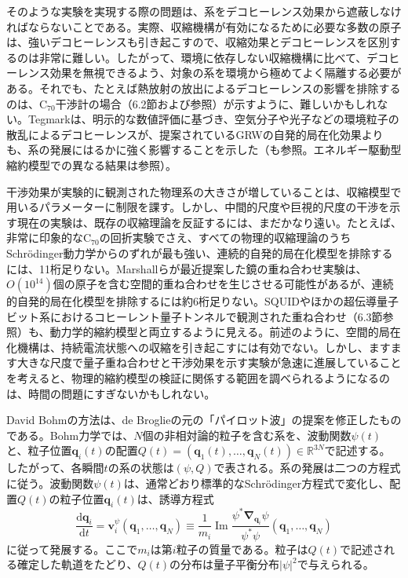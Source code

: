 \hypertarget{srcpage:354}{}\label{srcpage:354}
そのような実験を実現する際の問題は、系をデコヒーレンス効果から遮蔽しなければならないことである。実際、収縮機構が有効になるために必要な多数の原子は、強いデコヒーレンスも引き起こすので、収縮効果とデコヒーレンスを区別するのは非常に難しい\cite{ref166,ref444,ref467}。したがって、環境に依存しない収縮機構に比べて、デコヒーレンス効果を無視できるよう、対象の系を環境から極めてよく隔離する必要がある。それでも、たとえば熱放射の放出によるデコヒーレンスの影響を排除するのは、$\mathrm C_{70}$干渉計の場合（6.2節および\cite{ref267,ref270}参照）が示すように、難しいかもしれない。Tegmark\cite{ref166}は、明示的な数値評価に基づき、空気分子や光子などの環境粒子の散乱によるデコヒーレンスが、提案されているGRWの自発的局在化効果よりも、系の発展にはるかに強く影響することを示した（\cite{ref444,ref467}も参照。エネルギー駆動型縮約模型での異なる結果は\cite{ref461}参照）。

干渉効果が実験的に観測された物理系の大きさが増していることは、収縮模型で用いるパラメーターに制限を課す。しかし、中間的尺度や巨視的尺度の干渉を示す現在の実験は、既存の収縮理論を反証するには、まだかなり遠い。たとえば、非常に印象的な$\mathrm C_{70}$の回折実験でさえ、すべての物理的収縮理論のうちSchrödinger動力学からのずれが最も強い、連続的自発的局在化模型を排除するには、11桁足りない\cite{ref478}。Marshallら\cite{ref477}が最近提案した鏡の重ね合わせ実験は、$O(10^{14})$個の原子を含む空間的重ね合わせを生じさせる可能性があるが、連続的自発的局在化模型を排除するには約6桁足りない\cite{ref477,ref479}。SQUIDやほかの超伝導量子ビット系におけるコヒーレント量子トンネルで観測された重ね合わせ（6.3節参照）も、動力学的縮約模型と両立するように見える。前述のように、空間的局在化機構は、持続電流状態への収縮を引き起こすには有効でない\cite{ref444,ref464,ref465}。しかし、ますます大きな尺度で量子重ね合わせと干渉効果を示す実験が急速に進展していることを考えると、物理的縮約模型の検証に関係する範囲を調べられるようになるのは、時間の問題にすぎないかもしれない。

David Bohmの方法\cite{ref035,ref036,ref037}は、de Broglieの元の「パイロット波」の提案\cite{ref034}を修正したものである。Bohm力学では、$N$個の非相対論的粒子を含む系を、波動関数$\psi(t)$と、粒子位置$\boldsymbol q_i(t)$の配置$Q(t)=(\boldsymbol q_1(t),\ldots,\boldsymbol q_N(t))\in\mathbb R^{3N}$で記述する。
\hypertarget{srcpage:355}{}\label{srcpage:355}
したがって、各瞬間$t$の系の状態は$(\psi,Q)$で表される。系の発展は二つの方程式に従う。波動関数$\psi(t)$は、通常どおり標準的なSchrödinger方程式で変化し、配置$Q(t)$の粒子位置$\boldsymbol q_i(t)$は、誘導方程式
\begin{equation}
\frac{\mathrm d\boldsymbol q_i}{\mathrm dt}
=\boldsymbol v_i^{\psi}(\boldsymbol q_1,\ldots,\boldsymbol q_N)
\equiv\frac1{m_i}\operatorname{Im}\frac{\psi^*\boldsymbol\nabla_{\boldsymbol q_i}\psi}{\psi^*\psi}(\boldsymbol q_1,\ldots,\boldsymbol q_N)\tag{8.9}
\end{equation}
に従って発展する。ここで$m_i$は第$i$粒子の質量である。粒子は$Q(t)$で記述される確定した軌道をたどり、$Q(t)$の分布は量子平衡分布$|\psi|^2$で与えられる。

